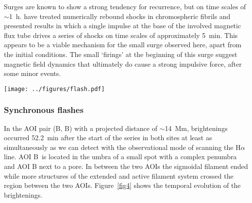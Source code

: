 Surges are known to show a strong tendency for recurrence, but on time scales of $\sim$1~h. \citet{1989ApJ...343..985S} have treated numerically rebound shocks in chromospheric fibrils and presented results in which a single impulse at the base of the involved magnetic flux tube drives a series of shocks on time scales of approximately 5~min. This appears to be a viable mechanism for the small surge observed here, apart from the initial conditions. The small `firings' at the beginning of this surge suggest magnetic field dynamics that ultimately do cause a strong impulsive force, after some minor events.


\begin{sidewaysfigure}[t]
\center 
\texttt{[image: ../figures/flash.pdf]} 
\caption{Simultaneous flash event on AOIs B and B\arcmin\ with projected distance $\approx$13.7 Mm. A pair of simultaneous, short, brightening was recorded at $t=52.2$ min. Top row from B\arcmin, bottom row from B. The tiles from left to right correspond to two successive H$\alpha$ scans. Upper x-axis is scaled to the wavelength of each 2-D filtergram tiles. Scanning time is numbered on the lower x-axis. $t=0$ corresponds to the beginning of the scan at 08:44 UT.  The integration time for each spectral position is $\approx 1$s, while the delay between two scans is $\approx 3$s (vertical dashed line). Each spectrogram on B is normalized with the background profile  (see Fig. \ref{fig5}) to emphasize the flash event. Neither the previous nor the following scan to the two presented exhibited any emission. The second scan (right half size of the figure) still shows some emission on the same positions. White arrows correspond to the position of the three different profiles in Fig. \ref{fig5}.}  
\label{fig4}
\end{sidewaysfigure}


\subsubsection*{Synchronous flashes\label{mini-flare}}
In the AOI pair (B, B\arcmin) with a projected distance of $\sim$14~Mm,
brightenings occurred 52.2~min after the start of the series in both sites at
least as simultaneously as we can detect with the observational mode of
scanning the H$\alpha$ line. AOI B\arcmin\ is located in the umbra of a small spot with a complex penumbra and AOI B next to a pore. In between the two AOIs the sigmoidal filament ended while more structures of the extended and active filament system crossed the region between the two AOIs. Figure~\ref{fig4} shows the temporal evolution of the brightenings. 

